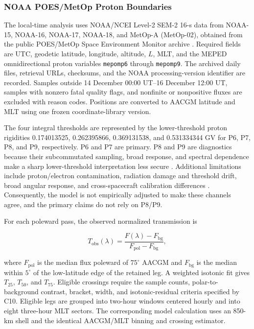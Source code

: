\subsubsection{NOAA POES/MetOp Proton Boundaries}

The local-time analysis uses NOAA/NCEI Level-2 SEM-2 16-s data from NOAA-15,
NOAA-16, NOAA-17, NOAA-18, and MetOp-A (MetOp-02), obtained from the public
POES/MetOp Space Environment Monitor archive \cite{NOAA-NCEI-POES-SEM2}.
Required fields are UTC, geodetic latitude, longitude, altitude, $L$, MLT, and
the MEPED omnidirectional proton variables \texttt{mepomp6} through
\texttt{mepomp9}. The archived daily files, retrieval URLs, checksums, and the
NOAA processing-version identifier are recorded. Samples outside 14 December
00:00 UT--16 December 12:00 UT, samples with nonzero fatal quality flags, and
nonfinite or nonpositive fluxes are excluded with reason codes. Positions are
converted to AACGM latitude and MLT using one frozen coordinate-library
version.

The four integral thresholds are represented by the lower-threshold proton
rigidities 0.174013525, 0.262395866, 0.369131538, and 0.531334344 GV for P6,
P7, P8, and P9, respectively. P6 and P7 are primary. P8 and P9 are diagnostics
because their subcommutated sampling, broad response, and spectral dependence
make a sharp lower-threshold interpretation less secure
\cite{Evans-2000-NOAA,Machol-2012-NOAA,Green-2013-NOAA,Yando-2011-JGR}.
Additional limitations include proton/electron contamination, radiation
damage and threshold drift, broad angular response, and cross-spacecraft
calibration differences \cite{Asikainen-2011-JASTP,Sandanger-2015-JGR,Peck-2015-JGR}.
Consequently, the model is not empirically adjusted to make these channels
agree, and the primary claims do not rely on P8/P9.

For each poleward pass, the observed normalized transmission is
\begin{linenomath*}
\begin{equation}
 T_{\mathrm{obs}}(\lambda)=
 \frac{F(\lambda)-F_{\mathrm{bg}}}
      {F_{\mathrm{pol}}-F_{\mathrm{bg}}},
 \label{eq:exp-poes-transmission}
\end{equation}
\end{linenomath*}
where $F_{\mathrm{pol}}$ is the median flux poleward of $75^{\circ}$ AACGM and
$F_{\mathrm{bg}}$ is the median within $5^{\circ}$ of the low-latitude edge of
the retained leg. A weighted isotonic fit gives $T_{25}$, $T_{50}$, and
$T_{75}$. Eligible crossings require the sample counts, polar-to-background
contrast, bracket, width, and isotonic-residual criteria specified by C10.
Eligible legs are grouped into two-hour windows centered hourly and into eight
three-hour MLT sectors. The corresponding model calculation uses an 850-km
shell and the identical AACGM/MLT binning and crossing estimator.

